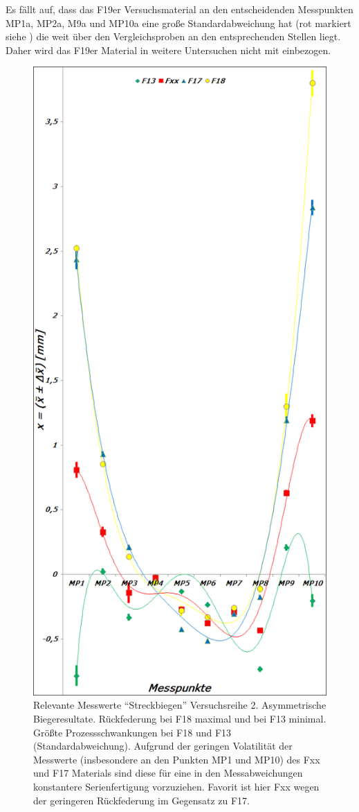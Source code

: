 \documentclass[12pt,a4paper,parskip,twoside,BCOR5mm,headsepline]{scrartcl}
\begin{document}
Es fällt auf, dass das F19er Versuchsmaterial an den entscheidenden Messpunkten MP1a, MP2a, M9a und MP10a eine große Standardabweichung hat (rot markiert siehe ) die weit über den Vergleichsproben an den entsprechenden Stellen liegt. Daher wird das F19er Material in weitere Untersuchen nicht mit einbezogen.\\
\begin{figure}[hbtp]
\centering
\includegraphics[width=.8\textwidth]{messwerte2}
\caption{Relevante Messwerte "`Streckbiegen"' Versuchsreihe 2. Asymmetrische Biegeresultate. Rückfederung bei F18 maximal und bei F13 minimal.  Größte Prozessschwankungen bei F18 und F13 (Standardabweichung). Aufgrund der geringen Volatilität der Messwerte (insbesondere an den Punkten MP1 und MP10) des Fxx und F17 Materials sind diese für eine in den Messabweichungen konstantere  Serienfertigung vorzuziehen. Favorit ist hier Fxx wegen der geringeren Rückfederung im Gegensatz zu F17.}
\label{fig:messw2}
\end{figure}
\end{document}
